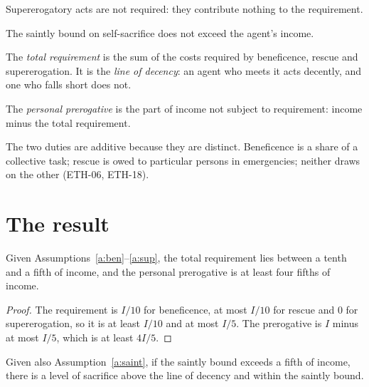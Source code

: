\documentclass{situationist-preprint}
\begin{document}
\begin{assumption}\label{a:sup}
Supererogatory acts are not required: they contribute nothing to the requirement.
\end{assumption}

\begin{assumption}\label{a:saint}
The saintly bound on self-sacrifice does not exceed the agent's income.
\end{assumption}

\begin{definition}\label{d:required}
The \emph{total requirement} is the sum of the costs required by beneficence, rescue and supererogation. It is the \emph{line of decency}: an agent who meets it acts decently, and one who falls short does not.
\end{definition}

\begin{definition}\label{d:prerogative}
The \emph{personal prerogative} is the part of income not subject to requirement: income minus the total requirement.
\end{definition}

The two duties are additive because they are distinct. Beneficence is a share of a collective task; rescue is owed to particular persons in emergencies; neither draws on the other (ETH-06, ETH-18).

\section{The result}

\begin{theorem}\label{t:moderate}
Given Assumptions~\ref{a:ben}--\ref{a:sup}, the total requirement lies between a tenth and a fifth of income, and the personal prerogative is at least four fifths of income.
\end{theorem}

\begin{proof}
The requirement is $I/10$ for beneficence, at most $I/10$ for rescue and $0$ for supererogation, so it is at least $I/10$ and at most $I/5$. The prerogative is $I$ minus at most $I/5$, which is at least $4I/5$.
\end{proof}

\begin{corollary}\label{c:room}
Given also Assumption~\ref{a:saint}, if the saintly bound exceeds a fifth of income, there is a level of sacrifice above the line of decency and within the saintly bound.
\end{corollary}
\end{document}
